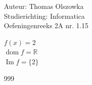 \documentclass[a4paper]{article}
\begin{document}
\noindent \large Auteur: Thomas Olszowka \\
\noindent \large Studierichting: Informatica\\
\noindent \large Oefeningenreeks 2A nr. 1.15\\

\medskip

\normalsize

$f(x) = 2$ \\

$\operatorname{dom}f = \mathbb{R}$ \\

$\operatorname{Im}f = \{2\}$ \\

\begin{thebibliography}{999}
\end{thebibliography}
\end{document}
